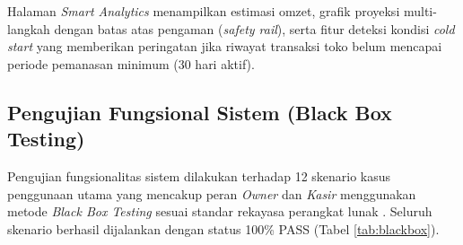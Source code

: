 \documentclass[10pt,a4paper]{article}
\begin{document}
Halaman \textit{Smart Analytics} menampilkan estimasi omzet, grafik proyeksi multi-langkah dengan batas atas pengaman (\textit{safety rail}), serta fitur deteksi kondisi \textit{cold start} yang memberikan peringatan jika riwayat transaksi toko belum mencapai periode pemanasan minimum (30 hari aktif).

\subsection{Pengujian Fungsional Sistem (Black Box Testing)}
Pengujian fungsionalitas sistem dilakukan terhadap 12 skenario kasus penggunaan utama yang mencakup peran \textit{Owner} dan \textit{Kasir} menggunakan metode \textit{Black Box Testing} sesuai standar rekayasa perangkat lunak \cite{pressman2020, myers2011, iso2021}. Seluruh skenario berhasil dijalankan dengan status 100\% PASS (Tabel \ref{tab:blackbox}).
\end{document}
